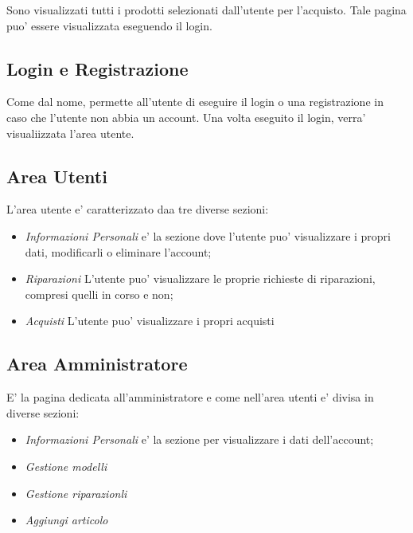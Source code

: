 Sono visualizzati tutti i prodotti selezionati dall'utente per l'acquisto. Tale pagina puo' essere
visualizzata eseguendo il login.

\subsection{Login e Registrazione}

Come dal nome, permette all'utente di eseguire il login o una registrazione in caso che l'utente 
non abbia un account. Una volta eseguito il login, verra' visualiizzata l'area utente.

\subsection{Area Utenti}

L'area utente e' caratterizzato daa tre diverse sezioni: 

\begin{itemize}
	\item \textit{Informazioni Personali} e' la sezione dove l'utente puo' visualizzare i propri dati,
	modificarli o eliminare l'account;
	\item\textit{Riparazioni} L'utente puo' visualizzare le proprie richieste di riparazioni, compresi
	quelli in corso e non;
	\item \textit{Acquisti } L'utente puo' visualizzare i propri acquisti
\end{itemize}

\subsection{Area Amministratore}

E' la pagina dedicata all'amministratore e come nell'area utenti e' divisa in diverse sezioni:

\begin{itemize}
	\item \textit{Informazioni Personali} e' la sezione per visualizzare i dati dell'account;
	\item \textit{Gestione modelli} 
	\item \textit{Gestione riparazionli}
	\item \textit{Aggiungi articolo}

\end{itemize}